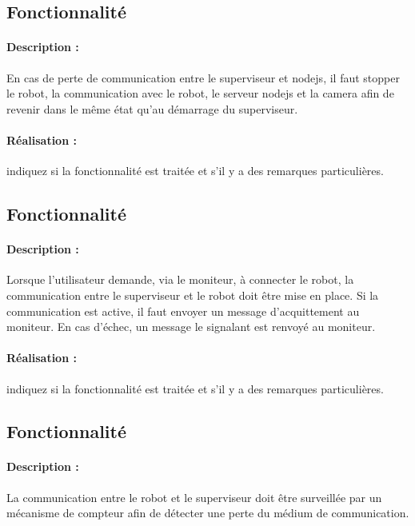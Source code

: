 \documentclass[11pt, a4paper]{paper}
\newcounter{cptreq}
\begin{document}
\subsection{Fonctionnalité \thecptreq}

\paragraph{Description :} En cas de perte de communication entre le superviseur et nodejs, il faut stopper le robot,  la communication avec le robot, le serveur nodejs et la camera afin de revenir dans le même état qu'au démarrage du superviseur.

\paragraph{\color{black}Réalisation :}  {\color{red} indiquez si la fonctionnalité est traitée et s'il y a des remarques particulières.}
{\color{gray}
\subsection{Fonctionnalité \thecptreq *}

\paragraph{Description :} Lorsque l'utilisateur demande, via le moniteur, à connecter le robot, la communication entre le superviseur et le robot doit être mise en place. Si la communication est active, il faut envoyer un message d'acquittement au moniteur. En cas d'échec, un message le signalant est renvoyé au moniteur.

\paragraph{\color{black}Réalisation :}  {\color{red} indiquez si la fonctionnalité est traitée et s'il y a des remarques particulières.}
}
\subsection{Fonctionnalité \thecptreq}

\paragraph{Description :} La communication entre le robot et le superviseur doit être surveillée par un mécanisme de compteur afin de détecter une perte du médium de communication.
\end{document}
